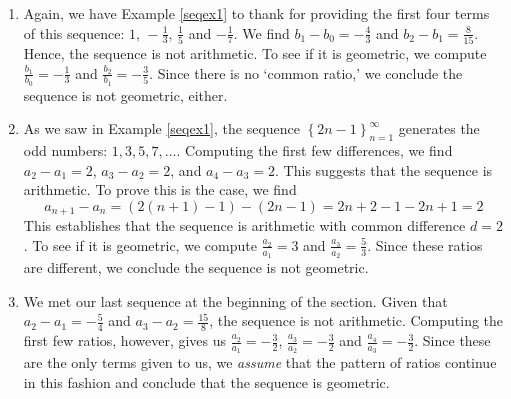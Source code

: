 \documentclass{ximera}
\begin{document}
\begin{example}
\begin{explanation}
\begin{enumerate}
To see if the sequence is geometric, we compute the ratios of successive terms.  The first three ratios  \textit{suggest} the sequence is geometric:   \[\frac{a_2}{a_1} = \frac{\frac{5}{9}}{\frac{1}{3}} = \frac{5}{3}, \;\;\; \frac{a_3}{a_2} = \frac{\frac{25}{27}}{\frac{5}{9}} = \frac{5}{3} \;\; \text{ and } \;\; \frac{a_4}{a_3} = \frac{\frac{125}{81}}{\frac{25}{27}} = \frac{5}{3}\] 
To \textit{prove} the sequence is geometric, however, we must show that $\frac{a_{n+1}}{a_{n}} = r$ for all $n$:

\[ \frac{a_{n+1}}{a_{n}} = \frac{\frac{5^{(n+1)-1}}{3^{n+1}}}{\frac{5^{n-1}}{3^{n}}} = \frac{5^{n}}{3^{n+1}} \cdot \frac{3^{n}}{5^{n-1}} = \frac{5}{3} \]

Hence, the sequence is geometric with common ratio $r = \frac{5}{3}$.

\item Again, we have Example \ref{seqex1} to thank for providing the first four terms of this sequence: $1, \, -\frac{1}{3}, \, \frac{1}{5}$ and $-\frac{1}{7}$.  We find $b_1 - b_0 =  -\frac{4}{3}$ and $b_2 - b_1 = \frac{8}{15}$.  Hence, the sequence is not arithmetic.  To see if it is geometric, we compute $\frac{b_1}{b_0} = -\frac{1}{3}$ and $\frac{b_2}{b_1} = -\frac{3}{5}$.  Since there is no `common ratio,' we conclude the sequence is not geometric, either.

\item  As we saw in Example \ref{seqex1}, the sequence $\left\{ 2n - 1 \right\}_{n=1}^{\infty}$ generates the odd numbers:  $1, 3, 5, 7, \ldots$.  Computing the first few differences, we find $a_2 - a_1 = 2$, $a_3 - a_2 = 2$, and $a_4 - a_3 = 2$.  This suggests that the sequence is arithmetic.  To prove this is the case, we find \[a_{n+1} - a_{n} = (2(n+1)-1) - (2n-1) = 2n+2-1-2n+1 = 2\]  This establishes that the sequence is arithmetic with common difference $d = 2$.  To see if it is geometric, we compute $\frac{a_2}{a_1} = 3$ and  $\frac{a_3}{a_2} = \frac{5}{3}$.  Since these ratios are different, we conclude the sequence is not geometric.

\item  We met our last sequence at the beginning of the section.  Given that $a_2 - a_1 = -\frac{5}{4}$ and $a_3 - a_2 = \frac{15}{8}$, the sequence is not arithmetic.  Computing the first few ratios, however, gives us $\frac{a_2}{a_1} = -\frac{3}{2}$, $\frac{a_3}{a_2} = -\frac{3}{2}$ and $\frac{a_4}{a_3} = -\frac{3}{2}$.  Since these are the only terms given to us, we \textit{assume} that the pattern of ratios continue in this fashion and conclude that the sequence is geometric. 

\end{enumerate}
\end{explanation}
\end{example}
\end{document}
